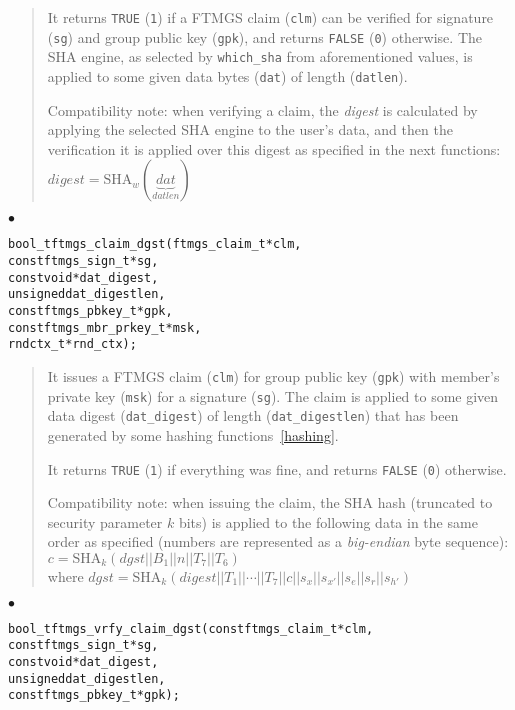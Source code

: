 \documentclass[a4paper]{article}
\newenvironment{api}%
{\noindent$\bullet$\hfill\begin{minipage}[t]{0.97\linewidth}\footnotesize\begin{alltt}}%
{\end{alltt}\end{minipage}}%
\begin{document}
\begin{quote}\footnotesize
It returns \verb|TRUE| (\verb|1|) if a FTMGS claim (\verb|clm|) can be
verified for signature (\verb|sg|) and group public key (\verb|gpk|),
and returns \verb|FALSE| (\verb|0|) otherwise. The SHA engine, as
selected by \verb|which_sha| from aforementioned values, is applied to
some given data bytes (\verb|dat|) of length (\verb|datlen|).

Compatibility note: when verifying a claim, the \emph{digest} is
calculated by applying the selected SHA engine to the user's data, and
then the verification it is applied over this digest as specified in
the next functions:\\
{$\mathit{digest} = \mathrm{SHA}_w(\underbrace{\mathit{dat}}_{\mathit{datlen}})$}
\end{quote}
\begin{api}
bool_t ftmgs_claim_dgst(ftmgs_claim_t* clm,
                        const ftmgs_sign_t* sg,
                        const void* dat_digest,
                        unsigned dat_digestlen,
                        const ftmgs_pbkey_t* gpk,
                        const ftmgs_mbr_prkey_t* msk,
                        rndctx_t* rnd_ctx);
\end{api}
\begin{quote}\footnotesize
It issues a FTMGS claim (\verb|clm|) for group public key (\verb|gpk|)
with member's private key (\verb|msk|) for a signature (\verb|sg|).
The claim is applied to some given data digest (\verb|dat_digest|) of
length (\verb|dat_digestlen|) that has been generated by some hashing
functions~\ref{hashing}.

It returns \verb|TRUE| (\verb|1|) if everything was fine, and returns
\verb|FALSE| (\verb|0|) otherwise.

Compatibility note: when issuing the claim, the SHA hash
(truncated to security parameter $k$ bits) is applied to the following
data in the same order as specified (numbers are represented as a
\emph{big-endian} byte sequence):\\ {$c =
  \mathrm{SHA}_k(\mathit{dgst}||B_1||n||T_7||T_6)$}
\\ where 
$\mathit{dgst} = \mathrm{SHA}_k(\mathit{digest}||T_1||\cdots||T_7||c||s_x||s_{x'}||s_e||s_r||s_{h'})$
\end{quote}
\begin{api}
bool_t ftmgs_vrfy_claim_dgst(const ftmgs_claim_t* clm,
                             const ftmgs_sign_t* sg,
                             const void* dat_digest,
                             unsigned dat_digestlen,
                             const ftmgs_pbkey_t* gpk);
\end{api}
\end{document}
